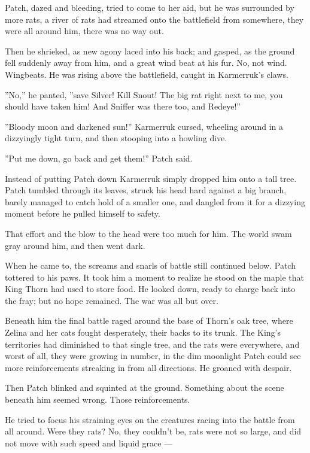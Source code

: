 \documentclass[12pt]{book}
\begin{document}
Patch, dazed and bleeding, tried to come to her aid, but he was surrounded by more rats, a river of rats had streamed onto the battlefield from somewhere, they were all around him, there was no way out.

Then he shrieked, as new agony laced into his back; and gasped, as the ground fell suddenly away from him, and a great wind beat at his fur. No, not wind. Wingbeats. He was rising above the battlefield, caught in Karmerruk's claws.

''No,'' he panted, ''save Silver! Kill Snout! The big rat right next to me, you should have taken him! And Sniffer was there too, and Redeye!''

''Bloody moon and darkened sun!'' Karmerruk cursed, wheeling around in a dizzyingly tight turn, and then stooping into a howling dive.

''Put me down, go back and get them!'' Patch said.

Instead of putting Patch down Karmerruk simply dropped him onto a tall tree. Patch tumbled through its leaves, struck his head hard against a big branch, barely managed to catch hold of a smaller one, and dangled from it for a dizzying moment before he pulled himself to safety.

That effort and the blow to the head were too much for him. The world swam gray around him, and then went dark.

When he came to, the screams and snarls of battle still continued below. Patch tottered to his paws. It took him a moment to realize he stood on the maple that King Thorn had used to store food. He looked down, ready to charge back into the fray; but no hope remained. The war was all but over.

Beneath him the final battle raged around the base of Thorn's oak tree, where Zelina and her cats fought desperately, their backs to its trunk. The King's territories had diminished to that single tree, and the rats were everywhere, and worst of all, they were growing in number, in the dim moonlight Patch could see more reinforcements streaking in from all directions. He groaned with despair.

Then Patch blinked and squinted at the ground. Something about the scene beneath him seemed wrong. Those reinforcements.

He tried to focus his straining eyes on the creatures racing into the battle from all around. Were they rats? No, they couldn't be, rats were not so large, and did not move with such speed and liquid grace ---
\end{document}
